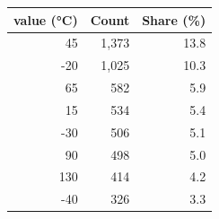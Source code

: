 \begin{tabular}{@{}rrr@{}}
\toprule
\Tg{} value (\unit{\celsius}) & Count & Share (\%) \\
\midrule
45 & 1,373 & 13.8 \\
-20 & 1,025 & 10.3 \\
65 & 582 & 5.9 \\
15 & 534 & 5.4 \\
-30 & 506 & 5.1 \\
90 & 498 & 5.0 \\
130 & 414 & 4.2 \\
-40 & 326 & 3.3 \\
\bottomrule
\end{tabular}
